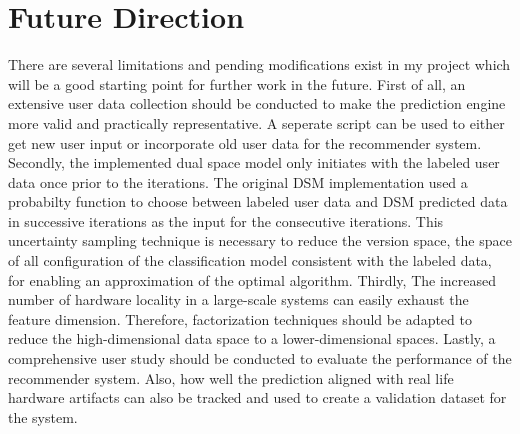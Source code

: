 \section{Future Direction}
\label{sec:future}
There are several limitations and pending modifications exist in my project which will be a good starting point for further work in the future. First of all,
an extensive user data collection should be conducted to make the prediction engine more valid and practically representative. A seperate
script can be used to either get new user input or incorporate old user data for the recommender system. Secondly, the implemented dual space model only
initiates with the labeled user data once prior to the iterations. The original DSM implementation used a probabilty function to choose between labeled
user data and DSM predicted data in successive iterations as the input for the consecutive iterations. This uncertainty sampling technique is necessary to
reduce the version space, the space of all configuration of the classification model consistent with the labeled data, for enabling an approximation of the
optimal algorithm. Thirdly, The increased number of hardware locality in a large-scale systems can easily exhaust the feature dimension. Therefore,
factorization techniques should be adapted to reduce the high-dimensional data space to a lower-dimensional spaces. Lastly, a comprehensive user study should
be conducted to evaluate the performance of the recommender system. Also, how well the prediction aligned with real life hardware artifacts can also be tracked
and used to create a validation dataset for the system.
